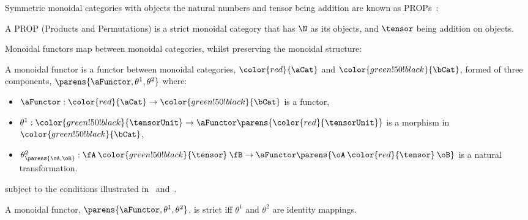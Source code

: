 Symmetric monoidal categories with objects the natural numbers and tensor being
addition are known as PROPs~\cite{Lack2004}:

\begin{definition}[PROP]
    A PROP (Products and Permutations) is a strict monoidal category that has
    $\N$ as its objects, and $\tensor$ being addition on objects.
\end{definition}

Monoidal functors map between monoidal categories, whilst preserving the
monoidal structure:

\newcommand{\monFunctorCoherenceUnit}{\theta^1}
\newcommand{\monFunctorCoherenceTensor}{\theta^2}
\newcommand{\monFunctorCoherenceTensorArgs}[2]{\theta^2_{\parens{#1,#2}}}

\newcommand{\inA}[1]{\color{red}{#1}}
\newcommand{\inB}[1]{\color{green!50!black}{#1}}
\newcommand{\tensA}{\mathbin{\inA\tensor}}
\newcommand{\tensB}{\mathbin{\inB\tensor}}

\begin{definition}
    A monoidal functor is a functor between monoidal categories, $\inA\aCat$ and
    $\inB\bCat$, formed of three components,
    $\parens{\aFunctor,\monFunctorCoherenceUnit, \monFunctorCoherenceTensor}$
    where:
    \begin{itemize}
        \item $\aFunctor : {\inA\aCat} \to {\inB\bCat}$ is a functor,
        \item $\monFunctorCoherenceUnit : {\inB\tensorUnit} \to
            \aFunctor\parens{{\inA\tensorUnit}}$ is a morphism in $\inB\bCat$,
        \item $\monFunctorCoherenceTensorArgs{\oA}{\oB} :
            \fA \tensB \fB \to \aFunctor\parens{\oA \tensA \oB}$ is a
            natural transformation.
    \end{itemize}
    subject to the conditions
    illustrated in~ and~.
\end{definition}

\begin{definition}
    A monoidal functor, $\parens{\aFunctor,\monFunctorCoherenceUnit, \monFunctorCoherenceTensor}$,
    is strict iff $\monFunctorCoherenceUnit$ and $\monFunctorCoherenceTensor$ are identity
    mappings.
\end{definition}

\newcommand{\fAB}{\aFunctor\parens{\oA \tensA \oB}}
\newcommand{\fBC}{\aFunctor\parens{\oB \tensA \oC}}
\newcommand{\fABCL}{\aFunctor\parens{\parens{\oA \tensA \oB} \tensA \oC}}
\newcommand{\fABCR}{\aFunctor\parens{\oA \tensA \parens{\oB \tensA \oC}}}

